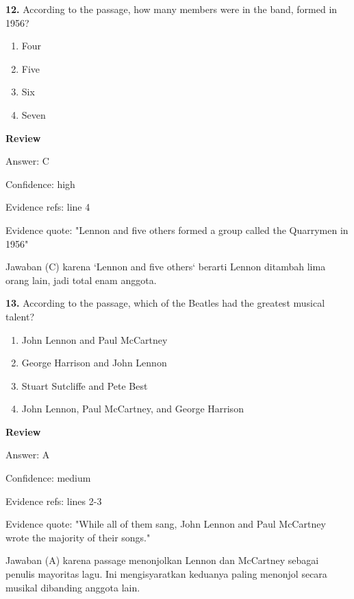 \documentclass[12pt]{article}
\begin{document}
\noindent\textbf{12.} According to the passage, how many members were in the band, formed in 1956?
\begin{enumerate}[label=(\Alph*),leftmargin=*,itemsep=0.2em]
\item Four
\item Five
\item Six
\item Seven
\end{enumerate}
\par
\begingroup
\setlength{\parskip}{0pt}
\setlength{\parindent}{0pt}
\textbf{Review}\par
Answer: C\par
Confidence: high\par
Evidence refs: line 4\par
Evidence quote: "Lennon and five others formed a group called the Quarrymen in 1956"\par
Jawaban (C) karena `Lennon and five others` berarti Lennon ditambah lima orang lain, jadi total enam anggota.\par
\endgroup
\par
\vspace{0.25\baselineskip}
\noindent\textbf{13.} According to the passage, which of the Beatles had the greatest musical talent?
\begin{enumerate}[label=(\Alph*),leftmargin=*,itemsep=0.2em]
\item John Lennon and Paul McCartney
\item George Harrison and John Lennon
\item Stuart Sutcliffe and Pete Best
\item John Lennon, Paul McCartney, and George Harrison
\end{enumerate}
\par
\begingroup
\setlength{\parskip}{0pt}
\setlength{\parindent}{0pt}
\textbf{Review}\par
Answer: A\par
Confidence: medium\par
Evidence refs: lines 2-3\par
Evidence quote: "While all of them sang, John Lennon and Paul McCartney wrote the majority of their songs."\par
Jawaban (A) karena passage menonjolkan Lennon dan McCartney sebagai penulis mayoritas lagu. Ini mengisyaratkan keduanya paling menonjol secara musikal dibanding anggota lain.\par
\endgroup
\par
\vspace{0.25\baselineskip}
\end{document}
